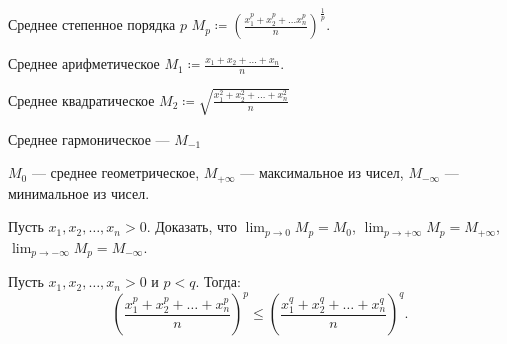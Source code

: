 \begin{definition}
    Среднее степенное порядка $p$  $M_p \coloneqq \left(\frac{x_1^p + x_2^p + \ldots x_n^p}{n}\right)^{\frac{1}{p}}$.
\end{definition}
\begin{definition}
    Среднее арифметическое $M_1 \coloneqq \frac{x_1 + x_2 + \ldots + x_n}{n}$.
\end{definition}
\begin{definition}
    Среднее квадратическое $M_2 \coloneqq \sqrt{\frac{x_1^2 + x_2^2 + \ldots + x_n^2}{n}}$
\end{definition}
\begin{definition}
    Среднее гармоническое --- $M_{-1}$
\end{definition}
\begin{definition}[Доопределение]
    $M_0$ --- среднее геометрическое,  $M_{+\infty}$ --- максимальное из чисел,  $M_{-\infty}$ --- минимальное из чисел. 
\end{definition}
\begin{exerc}
    Пусть $x_1, x_2, \ldots, x_n > 0$. Доказать, что $\lim_{p \to 0} M_p = M_0$,  $\lim_{p \to +\infty} M_p = M_{+\infty}$,  $\lim_{p \to -\infty} M_p = M_{-\infty}$.
\end{exerc}
\begin{theorem}
    Пусть $x_1, x_2, \ldots, x_n > 0$ и $p < q$. Тогда:
     \[
         \left( \frac{x_1 ^ p + x_2^p + \ldots + x_n^p}{n} \right)^p \le \left( \frac{x_1 ^ q + x_2^q + \ldots + x_n^q}{n} \right)^q
    .\] 
\end{theorem}

